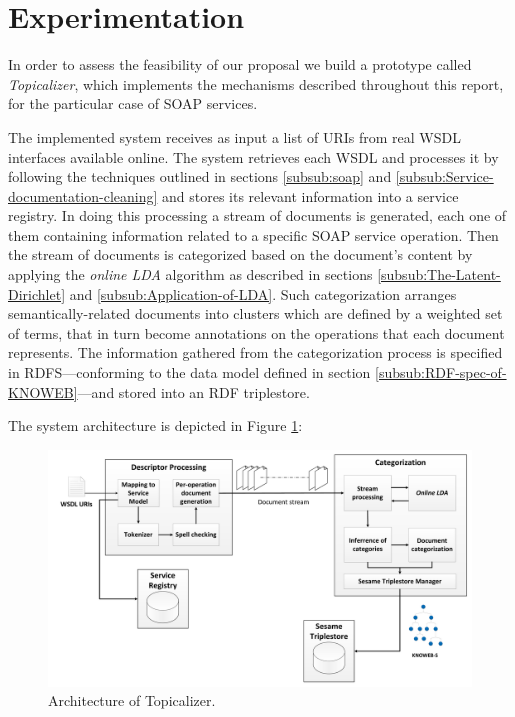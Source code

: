 \section{Experimentation}
\label{sec:experimentation}

\noindent In order to assess the feasibility of our proposal we build a prototype called \emph{Topicalizer}, which implements the mechanisms described throughout this report, for the particular case of SOAP services. 

The implemented system receives as input a list of URIs from real WSDL interfaces available online. The system retrieves each WSDL and processes it by following the techniques outlined in sections \ref{subsub:soap} and \ref{subsub:Service-documentation-cleaning} and stores its relevant information into a service registry. In doing this processing a stream of documents is generated, each one of them containing information related to a specific SOAP service operation. Then the stream of documents is categorized based on the document's content by applying the \emph{online LDA} algorithm as described in sections \ref{subsub:The-Latent-Dirichlet} and \ref{subsub:Application-of-LDA}. Such categorization arranges semantically-related documents into clusters which are defined by a weighted set of terms, that in turn become annotations on the operations that each document represents. The information gathered from the categorization process is specified in RDFS---conforming to the data model defined in section \ref{subsub:RDF-spec-of-KNOWEB}---and stored into an RDF triplestore.

The system architecture is depicted in Figure \ref{prototype-architecture}:

\begin{figure}
\includegraphics[scale=0.20]{images/prototype-architecture}

\caption{Architecture of Topicalizer.}
\label{prototype-architecture}

\end{figure}


